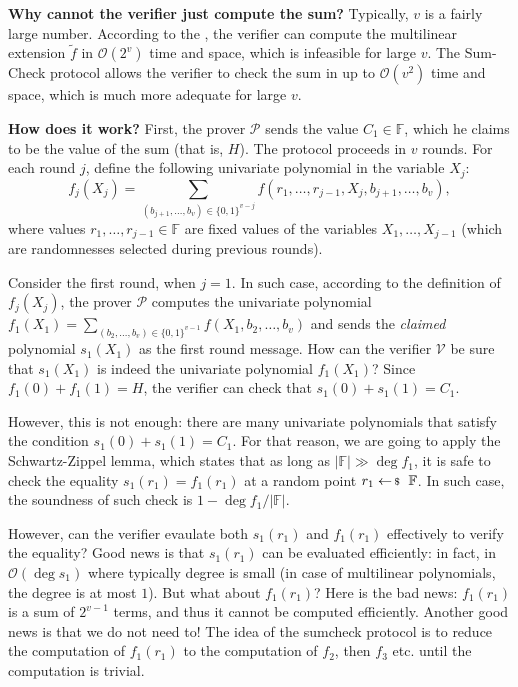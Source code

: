 \documentclass[../../book.tex]{subfiles}
\begin{document}
\textbf{Why cannot the verifier just compute the sum?} Typically, $v$ is a fairly
large number. According to the ,
the verifier can compute the multilinear extension $\widetilde{f}$ in
$\mathcal{O}(2^v)$ time and space, which is infeasible for large $v$. The
Sum-Check protocol allows the verifier to check the sum in up to
$\mathcal{O}(v^2)$ time and space, which is much more adequate for large $v$.

\textbf{How does it work?} First, the prover $\mathcal{P}$ sends the value $C_1
\in \mathbb{F}$, which he claims to be the value of the sum (that is, $H$).
The protocol proceeds in $v$ rounds. For each round $j$, define the 
following univariate polynomial in the variable $X_j$:
\begin{equation*}
    f_j(X_j) = \sum_{(b_{j+1},\dots,b_v) \in \{0,1\}^{v-j}} f(r_1,\dots,r_{j-1},X_j,b_{j+1},\dots,b_v),
\end{equation*}
where values $r_1,\dots,r_{j-1} \in \mathbb{F}$ are fixed values of the
variables $X_1,\dots,X_{j-1}$ (which are randomnesses selected during previous
rounds).

Consider the first round, when $j=1$. In such case, according to the definition
of $f_j(X_j)$, the prover $\mathcal{P}$ computes the univariate polynomial
$f_1(X_1) = \sum_{(b_2,\dots,b_v) \in \{0,1\}^{v-1}} f(X_1,b_2,\dots,b_v)$ and 
sends the \textit{claimed} polynomial $s_1(X_1)$ as the first round message.
How can the verifier $\mathcal{V}$ be sure that $s_1(X_1)$ is indeed the
univariate polynomial $f_1(X_1)$? Since $f_1(0) + f_1(1) = H$, the verifier
can check that $s_1(0) + s_1(1) = C_1$. 

However, this is not enough: there are many univariate polynomials that satisfy
the condition $s_1(0) + s_1(1) = C_1$. For that reason, we are going to apply
the Schwartz-Zippel lemma, which states that as long as $|\mathbb{F}| \gg \deg
f_1$, it is safe to check the equality $s_1(r_1) = f_1(r_1)$ at a random point
$r_1 \leftarrowS \mathbb{F}$. In such case, the soundness of such check is
$1-\deg f_1/|\mathbb{F}|$. 

However, can the verifier evaulate both $s_1(r_1)$ and $f_1(r_1)$ effectively to
verify the equality? Good news is that $s_1(r_1)$ can be evaluated efficiently: in
fact, in $\mathcal{O}(\deg s_1)$ where typically degree is small (in case of
multilinear polynomials, the degree is at most $1$). But what about $f_1(r_1)$?
Here is the bad news: $f_1(r_1)$ is a sum of $2^{v-1}$ terms, and thus it cannot
be computed efficiently. Another good news is that we do not need to! The idea
of the sumcheck protocol is to reduce the computation of $f_1(r_1)$ to the
computation of $f_2$, then $f_3$ etc. until the computation is trivial. 
\end{document}
